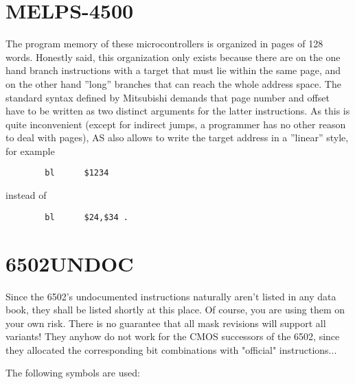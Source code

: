 \documentclass[12pt,twoside]{report}
\begin{document}

\section{MELPS-4500}

The program memory of these microcontrollers is organized in pages of
128 words.  Honestly said, this organization only exists because there
are on the one hand branch instructions with a target that must lie
within the same page, and on the other hand ''long'' branches that can
reach the whole address space.  The standard syntax defined by
Mitsubishi demands that page number and offset have to be written as
two distinct arguments for the latter instructions.  As this is
quite inconvenient (except for indirect jumps, a programmer has no
other reason to deal with pages), AS also allows to write the target
address in a ''linear'' style, for example
\begin{verbatim}
        bl      $1234
\end{verbatim}
instead of
\begin{verbatim}
        bl      $24,$34 .
\end{verbatim}


\section{6502UNDOC}

Since the 6502's undocumented instructions naturally aren't listed in
any data book, they shall be listed shortly at this place.  Of
course, you are using them on your own risk.  There is no guarantee
that all mask revisions will support all variants!  They anyhow do 
not work for the CMOS successors of the 6502, since they allocated 
the corresponding bit combinations with "official" instructions... 

The following symbols are used:
\end{document}
